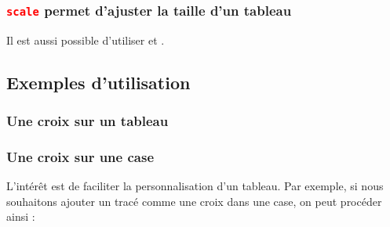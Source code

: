 \subsubsection{\texttt{\textcolor{red}{scale}} permet d'ajuster la taille d'un tableau}


\begin{tkzexample}[width=7cm,small]
\end{tkzexample}  

Il est aussi possible d'utiliser   et .

\begin{tkzexample}[width=7cm,small]
\end{tkzexample}  


\subsection{Exemples d'utilisation}
\subsubsection{Une croix sur un tableau}

\begin{tkzexample}
\end{tkzexample}  

\subsubsection{Une croix sur une case}

L'intérêt est de faciliter la personnalisation d'un tableau. Par exemple, si nous souhaitons ajouter un tracé comme une croix dans une case, on peut procéder ainsi :

